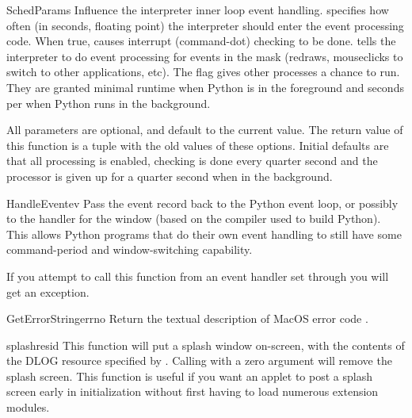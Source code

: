\begin{funcdesc}{SchedParams}{}
Influence the interpreter inner loop event handling. 
specifies how often (in seconds, floating point) the interpreter
should enter the event processing code. When true,  causes
interrupt (command-dot) checking to be done.  tells the
interpreter to do event processing for events in the mask (redraws,
mouseclicks to switch to other applications, etc). The 
flag gives other processes a chance to run. They are granted minimal
runtime when Python is in the foreground and  seconds per
 when Python runs in the background.

All parameters are optional, and default to the current value. The return
value of this function is a tuple with the old values of these options.
Initial defaults are that all processing is enabled, checking is done every
quarter second and the processor is given up for a quarter second when in the
background.
\end{funcdesc}

\begin{funcdesc}{HandleEvent}{ev}
Pass the event record  back to the Python event loop, or
possibly to the handler for the  window (based on the
compiler used to build Python). This allows Python programs that do
their own event handling to still have some command-period and
window-switching capability.

If you attempt to call this function from an event handler set through
 you will get an exception.
\end{funcdesc}

\begin{funcdesc}{GetErrorString}{errno}
Return the textual description of MacOS error code .
\end{funcdesc}

\begin{funcdesc}{splash}{resid}
This function will put a splash window
on-screen, with the contents of the DLOG resource specified by
. Calling with a zero argument will remove the splash
screen. This function is useful if you want an applet to post a splash screen
early in initialization without first having to load numerous
extension modules.
\end{funcdesc}


